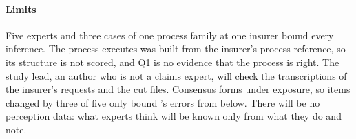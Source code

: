 \paragraph{Limits}
Five experts and three cases of one process family at one insurer bound every inference. The process \casepath executes was built from the insurer's process reference, so its structure is not scored, and Q1 is no evidence that the process is right. The study lead, an author who is not a claims expert, will check the transcriptions of the insurer's requests and the cut files. Consensus forms under exposure, so items changed by three of five only bound \casepath's errors from below. There will be no perception data: what experts think will be known only from what they do and note.
